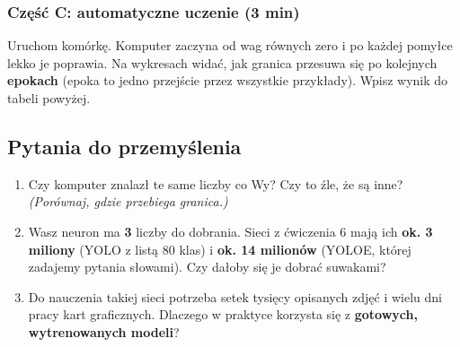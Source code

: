 \subsubsection{Część C: automatyczne uczenie (3 min)}\label{czux119ux15bux107-c-automatyczne-uczenie-3-min}

Uruchom komórkę. Komputer zaczyna od wag równych zero i po każdej pomyłce lekko je poprawia. Na wykresach widać, jak granica przesuwa się po kolejnych \textbf{epokach} (epoka to jedno przejście przez wszystkie przykłady). Wpisz wynik do tabeli powyżej.

\subsection{Pytania do przemyślenia}\label{pytania-do-przemyux15blenia}

\begin{enumerate}
\def\labelenumi{\arabic{enumi}.}
\tightlist
\item
  Czy komputer znalazł te same liczby co Wy? Czy to źle, że są inne? \emph{(Porównaj, gdzie przebiega granica.)}
\item
  Wasz neuron ma \textbf{3} liczby do dobrania. Sieci z ćwiczenia 6 mają ich \textbf{ok. 3 miliony} (YOLO z listą 80 klas) i \textbf{ok. 14 milionów} (YOLOE, której zadajemy pytania słowami). Czy dałoby się je dobrać suwakami?
\item
  Do nauczenia takiej sieci potrzeba setek tysięcy opisanych zdjęć i wielu dni pracy kart graficznych. Dlaczego w praktyce korzysta się z \textbf{gotowych, wytrenowanych modeli}?
\end{enumerate}
